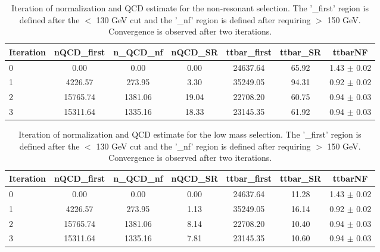 \begin{center}
\begin{table}[h!]%
  \begin{tabular}{l|c|c|c|c|c|c}
    \hline\hline
    Iteration &      nQCD\_first &   n\_QCD\_nf &    nQCD\_SR &      ttbar\_first &           ttbar\_SR &     ttbarNF       \\\hline
    0        &       0.00 &          0.00 &          0.00 &          24637.64 &      65.92 &         1.43 $\pm$ 0.02  \\\hline
    1        &       4226.57 &       273.95 &        3.30 &          35249.05 &      94.31 &         0.92 $\pm$ 0.02   \\\hline
    2        &       15765.74 &      1381.06 &       19.04 &         22708.20 &      60.75 &         0.94 $\pm$ 0.03   \\\hline
    3        &       15311.64 &      1335.16 &       18.33 &         23145.35 &      61.92 &         0.94 $\pm$ 0.03   \\\hline
    \hline
  \end{tabular}
\caption{Iteration of \ttbar normalization and QCD estimate for the non-resonant selection. The '\_first' region is defined after the \mww $<$ 130 GeV cut and the '\_nf' region is defined after requiring \ptbb $>$ 150 GeV. Convergence is observed after two iterations.}
\label{tab:ttbarQCDiter_nonres}
\end{table}

\begin{table}[h!]%
  \begin{tabular}{l|c|c|c|c|c|c}
    \hline\hline
    Iteration &      nQCD\_first &   n\_QCD\_nf &    nQCD\_SR &      ttbar\_first &           ttbar\_SR &     ttbarNF       \\\hline
    0        &       0.00 &          0.00 &          0.00 &          24637.64 &      11.28 &         1.43 $\pm$ 0.02        \\\hline
    1        &       4226.57 &       273.95 &        1.13 &          35249.05 &      16.14 &         0.92 $\pm$ 0.02        \\\hline
    2        &       15765.74 &      1381.06 &       8.14 &          22708.20 &      10.40 &         0.94 $\pm$ 0.03        \\\hline
    3        &       15311.64 &      1335.16 &       7.81 &          23145.35 &      10.60 &         0.94 $\pm$ 0.03        \\\hline
    \hline
  \end{tabular}
\caption{Iteration of \ttbar normalization and QCD estimate for the low mass selection. The '\_first' region is defined after the \mww $<$ 130 GeV cut and the '\_nf' region is defined after requiring \ptbb $>$ 150 GeV. Convergence is observed after two iterations.}
\label{tab:ttbarQCDiter_low}
\end{table}


\end{center}
